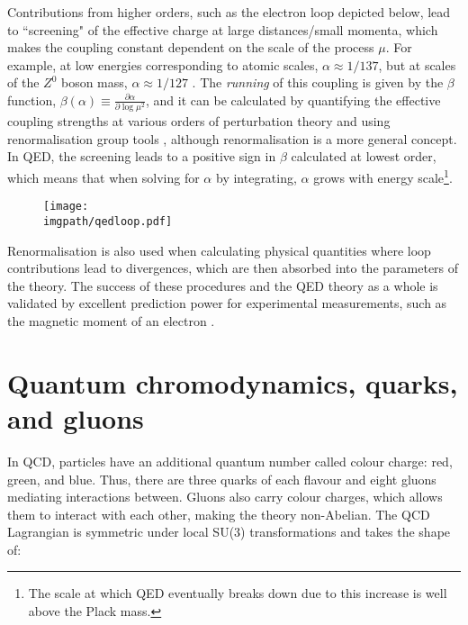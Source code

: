Contributions from higher orders, such as the electron loop depicted below, lead to ``screening" of the effective charge at large distances/small momenta, which makes the coupling constant dependent on the scale of the process $\mu$. For example, at low energies corresponding to atomic scales, $\alpha \approx 1/137$, but at scales of the $Z^0$ boson mass, $\alpha \approx 1/127$ \cite{fritzschFundamentalConstantsHigh2002}. The \textit{running} of this coupling is given by the $\beta$ function, $\beta(\alpha) \equiv \frac{\partial \alpha}{\partial \log \mu^2}$, and it can be calculated by quantifying the effective coupling strengths at various orders of perturbation theory and using renormalisation group tools \cite{delamotteHintRenormalization2004}, although renormalisation is a more general concept. In QED, the screening leads to a positive sign in $\beta$ calculated at lowest order, which means that when solving for $\alpha$ by integrating, $\alpha$ grows with energy scale\footnote{The scale at which QED eventually breaks down due to this increase is well above the Plack mass.}.

\begin{figure}[H]
\texttt{[image: \\imgpath/qedloop.pdf]}
\end{figure}

Renormalisation is also used when calculating physical quantities where loop contributions lead to divergences, which are then absorbed into the parameters of the theory. The success of these procedures and the QED theory as a whole is validated by excellent prediction power for experimental measurements, such as the magnetic moment of an electron \cite{odomNewMeasurementElectron2006}.

\section{Quantum chromodynamics, quarks, and gluons}

In QCD, particles have an additional quantum number called colour charge: red, green, and blue. Thus, there are three quarks of each flavour and eight gluons mediating interactions between. Gluons also carry colour charges, which allows them to interact with each other, making the theory non-Abelian. The QCD Lagrangian is symmetric under local SU($3$) transformations and takes the shape of:

